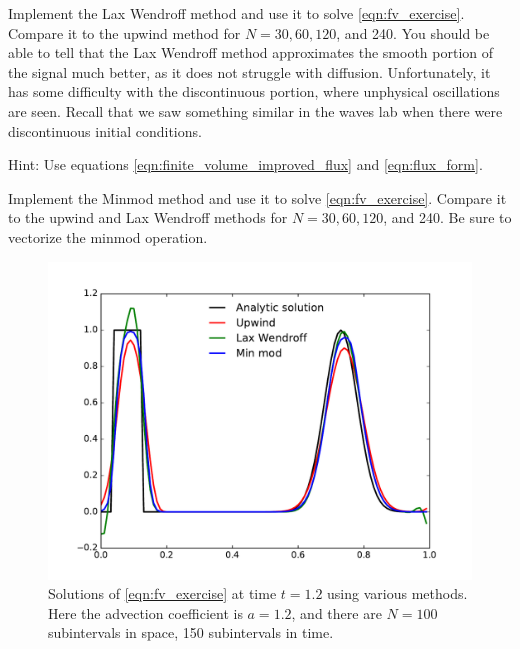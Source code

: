 
\begin{problem}
Implement the Lax Wendroff method and use it to solve \eqref{eqn:fv_exercise}.
Compare it to the upwind method for $N = 30, 60, 120$, and 240.
You should be able to tell that the Lax Wendroff method approximates the smooth portion of the signal much better, as it does not struggle with diffusion.
Unfortunately, it has some difficulty with the discontinuous portion, where unphysical oscillations are seen.
Recall that we saw something similar in the waves lab when there were discontinuous initial conditions.

Hint: Use equations \ref{eqn:finite_volume_improved_flux} and \ref{eqn:flux_form}.
\end{problem}

\begin{problem}
Implement the Minmod method and use it to solve \eqref{eqn:fv_exercise}.
Compare it to the upwind and Lax Wendroff methods for $N = 30, 60, 120$, and 240.
Be sure to vectorize the minmod operation.
\end{problem}

\begin{figure}
\centering
\includegraphics[width=\textwidth]{FiniteVolume_Comparisons.pdf}
\caption{Solutions of \eqref{eqn:fv_exercise} at time $t = 1.2$ using various methods.
Here the advection coefficient is $a = 1.2$, and there are  $N = 100$ subintervals in space, 150 subintervals in time.}
\label{fig:fv_Comparisons}
\end{figure}

